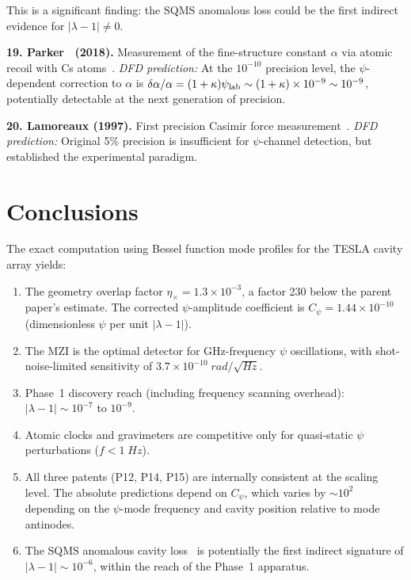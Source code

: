 \documentclass[aps,prd,twocolumn,superscriptaddress,nofootinbib]{revtex4-2}
\newcommand{\ee}[1]{\times 10^{#1}}
\begin{document}
This is a significant finding: the SQMS anomalous loss could
be the first indirect evidence for $|\lambda-1| \neq 0$.

\textbf{19. Parker \etal\ (2018).} Measurement of the
fine-structure constant $\alpha$ via atomic recoil with
Cs atoms~\cite{Parker2018}.  \textit{DFD prediction:}
At the $10^{-10}$ precision level, the $\psi$-dependent
correction to $\alpha$ is $\delta\alpha/\alpha = (1+\kappa)\psi_{\rm lab}
\sim (1+\kappa)\times 10^{-9} \sim 10^{-9}$, potentially
detectable at the next generation of precision.

\textbf{20. Lamoreaux (1997).} First precision Casimir force
measurement~\cite{Lamoreaux1997}.  \textit{DFD prediction:}
Original 5\% precision is insufficient for $\psi$-channel
detection, but established the experimental paradigm.

\section{Conclusions}
\label{sec:conclusions}

The exact computation using Bessel function mode profiles for
the TESLA cavity array yields:

\begin{enumerate}
\item The geometry overlap factor $\eta_\times = 1.3\ee{-3}$,
a factor 230 below the parent paper's estimate.  The corrected
$\psi$-amplitude coefficient is $C_\psi = 1.44\ee{-10}$
(dimensionless $\psi$ per unit $|\lambda-1|$).

\item The MZI is the optimal detector for GHz-frequency
$\psi$ oscillations, with shot-noise-limited sensitivity
of $3.7\ee{-10}\;\si{rad/\sqrt{Hz}}$.

\item Phase~1 discovery reach (including frequency scanning
overhead): $|\lambda-1| \sim 10^{-7}$ to $10^{-9}$.

\item Atomic clocks and gravimeters are competitive only
for quasi-static $\psi$ perturbations ($f < 1\;\si{Hz}$).

\item All three patents (P12, P14, P15) are internally
consistent at the scaling level.  The absolute predictions
depend on $C_\psi$, which varies by $\sim 10^2$ depending
on the $\psi$-mode frequency and cavity position relative
to mode antinodes.

\item The SQMS anomalous cavity loss~\cite{Romanenko2023}
is potentially the first indirect signature of
$|\lambda-1| \sim 10^{-6}$, within the reach of the
Phase~1 apparatus.
\end{enumerate}
\end{document}
